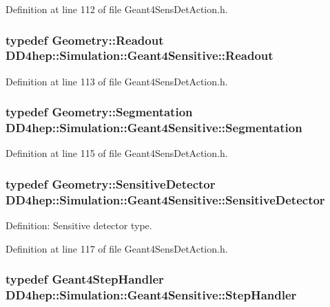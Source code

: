 Definition at line 112 of file Geant4SensDetAction.h.\hypertarget{class_d_d4hep_1_1_simulation_1_1_geant4_sensitive_a2dc0e9ab41aeebbb0bad179419eeac72}{
\subsubsection[{Readout}]{\setlength{\rightskip}{0pt plus 5cm}typedef {\bf Geometry::Readout} {\bf DD4hep::Simulation::Geant4Sensitive::Readout}}}
\label{class_d_d4hep_1_1_simulation_1_1_geant4_sensitive_a2dc0e9ab41aeebbb0bad179419eeac72}


Definition at line 113 of file Geant4SensDetAction.h.\hypertarget{class_d_d4hep_1_1_simulation_1_1_geant4_sensitive_ac898770dc0c398f3b7b88d1bf5f72314}{
\subsubsection[{Segmentation}]{\setlength{\rightskip}{0pt plus 5cm}typedef {\bf Geometry::Segmentation} {\bf DD4hep::Simulation::Geant4Sensitive::Segmentation}}}
\label{class_d_d4hep_1_1_simulation_1_1_geant4_sensitive_ac898770dc0c398f3b7b88d1bf5f72314}


Definition at line 115 of file Geant4SensDetAction.h.\hypertarget{class_d_d4hep_1_1_simulation_1_1_geant4_sensitive_a985a23f6592b3ab41b9aa45e47fbc9ea}{
\subsubsection[{SensitiveDetector}]{\setlength{\rightskip}{0pt plus 5cm}typedef {\bf Geometry::SensitiveDetector} {\bf DD4hep::Simulation::Geant4Sensitive::SensitiveDetector}}}
\label{class_d_d4hep_1_1_simulation_1_1_geant4_sensitive_a985a23f6592b3ab41b9aa45e47fbc9ea}


Definition: Sensitive detector type. 

Definition at line 117 of file Geant4SensDetAction.h.\hypertarget{class_d_d4hep_1_1_simulation_1_1_geant4_sensitive_a6df3adaabfad8e56f08282f2cf70a9b7}{
\subsubsection[{StepHandler}]{\setlength{\rightskip}{0pt plus 5cm}typedef {\bf Geant4StepHandler} {\bf DD4hep::Simulation::Geant4Sensitive::StepHandler}}}
\label{class_d_d4hep_1_1_simulation_1_1_geant4_sensitive_a6df3adaabfad8e56f08282f2cf70a9b7}


